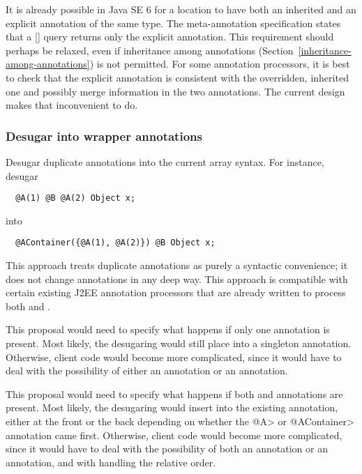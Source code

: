\documentclass[10pt]{article}
\begin{document}
It is already possible in Java SE 6 for a location to have both an
inherited and an explicit annotation of the same type.  The 
 meta-annotation specification states that a
[] query returns only the
explicit annotation.  This requirement should perhaps be relaxed, even if
inheritance among annotations (Section~\ref{inheritance-among-annotations})
is not permitted.  For some annotation
processors, it is best to check that the explicit annotation is consistent
with the overridden, inherited one and possibly merge information in the
two annotations.  The current design makes that inconvenient to do.


\subsubsection{Desugar into wrapper annotations\label{duplicate-annotations-desugar}}

Desugar duplicate annotations into
the current array syntax.  For instance, desugar

\begin{Verbatim}
  @A(1) @B @A(2) Object x;
\end{Verbatim}

\noindent
into

\begin{Verbatim}
  @AContainer({@A(1), @A(2)}) @B Object x;
\end{Verbatim}

This approach treats duplicate annotations as purely a syntactic
convenience; it does not change annotations in any deep way.  This approach
is compatible with certain existing J2EE annotation processors that are
already written to process both  and .

This proposal would need to specify what happens if only one 
annotation is present.  Most likely, the desugaring
would still place  into a singleton  annotation.
Otherwise, client code would become more complicated, since it would have
to deal with the possibility of either an  annotation or an
 annotation.

This proposal would need to specify what happens if both  and
 annotations are present.  Most likely, the desugaring
would insert  into the existing  annotation,
either at the front or the back depending on whether the \<@A> or
\<@AContainer> annotation came first.
Otherwise, client code would become more complicated, since it would have
to deal with the possibility of both an  annotation or an
 annotation, and with handling the relative order.
\end{document}

